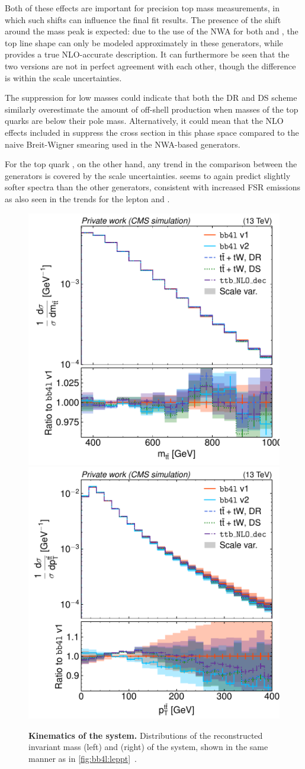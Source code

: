 Both of these effects are important for precision top mass measurements, in which such shifts can influence the final fit results. The presence of the shift around the mass peak is expected: due to the use of the NWA for both \tttWsum and \ttb, the top line shape can only be modeled approximately in these generators, while \bbfourl provides a true NLO-accurate description. It can furthermore be seen that the two \bbfourl versions are not in perfect agreement with each other, though the difference is within the scale uncertainties.

The suppression for low masses could indicate that both the DR and DS scheme similarly overestimate the amount of off-shell \ttbar production when masses of the top quarks are below their pole mass. Alternatively, it could mean that the NLO effects included in \bbfourl suppress the cross section in this phase space compared to the naive Breit-Wigner smearing used in the NWA-based generators.

For the top quark \pt, on the other hand, any trend in the comparison between the generators is covered by the scale uncertainties. \bbfourl  seems to again predict slightly softer \pt spectra than the other generators, consistent with increased FSR emissions as also seen in the trends for the lepton \pt and \mll.

\begin{figure}[tp]
    \centering
    \includegraphics[width=0.49 \textwidth]{figures/bb4l/generators/MC_TTBAR_DILEP_SPINDENSITY_ttbar_mass.pdf}
    \hfill
    \includegraphics[width=0.49 \textwidth]{figures/bb4l/generators/MC_TTBAR_DILEP_SPINDENSITY_ttbar_pt.pdf}
    \caption{\textbf{Kinematics of the \ttbar system.} Distributions of the reconstructed invariant mass (left) and \pt (right) of the \ttbar system, shown in the same manner as in \cref{fig:bb4l:leppt}~\cite{CMS:NOTE-2023-015}.}
    \label{fig:bb4l:ttbar}
\end{figure}

